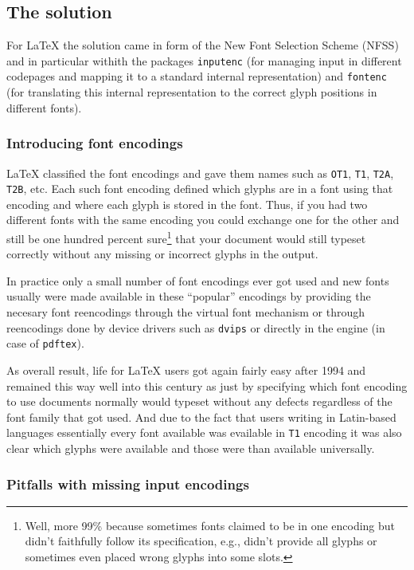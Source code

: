 \documentclass{ltugboat}
\newcommand\LPack[1]{\texttt{#1}}
\newcommand\Prog[1]{\texttt{#1}}
\begin{document}
\subsection{The \LaTeXe{} solution}

For \LaTeX{} the solution came in form of the New Font Selection
Scheme (NFSS)~\cite{} and in particular withith the packages
\LPack{inputenc} (for managing input in different codepages and
mapping it to a standard internal representation) and \LPack{fontenc}
(for translating this internal representation to the correct glyph
positions in different fonts).

\subsubsection{Introducing font encodings}

\LaTeX{} classified the font encodings and gave them names such as
\texttt{OT1}, \texttt{T1}, \texttt{T2A}, \texttt{T2B}, etc. Each such
font encoding defined which glyphs are in a font using that encoding
and where each glyph is stored in the font. Thus, if you had two
different fonts with the same encoding you could exchange one for the
other and still be one hundred percent sure\footnote{Well, more 99\%
  because sometimes fonts claimed to be in one encoding but didn't
  faithfully follow its specification, e.g., didn't provide all
  glyphs or sometimes even placed wrong glyphs into some slots.}
that your document would still typeset correctly without any missing
or incorrect glyphs in the output.

In practice only a small number of font encodings ever got used and
new fonts usually were made available in these ``popular'' encodings
by providing the necesary font reencodings through the virtual font
mechanism or through reencodings done by device drivers such as
\Prog{dvips} or directly in the engine (in case of \Prog{pdftex}).

As overall result, life for \LaTeX{} users got again fairly easy after
1994 and remained this way well into this century as just by
specifying which font encoding to use documents normally would typeset
without any defects regardless of the font family that got used. And
due to the fact that users writing in Latin-based languages
essentially every font available was evailable in \texttt{T1} encoding
it was also clear which glyphs were available and those were than
available universally.

\subsubsection{Pitfalls with missing input encodings}
\end{document}
